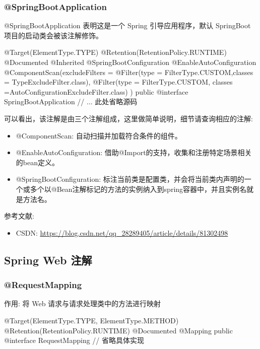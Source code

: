 \subsubsection{@SpringBootApplication}

@SpringBootApplication 表明这是一个 Spring 引导应用程序，默认 SpringBoot 项目的启动类会被该注解修饰。

\begin{Java}
@Target(ElementType.TYPE)
@Retention(RetentionPolicy.RUNTIME)
@Documented
@Inherited
@SpringBootConfiguration
@EnableAutoConfiguration
@ComponentScan(excludeFilters = { 
    @Filter(type = FilterType.CUSTOM,classes = TypeExcludeFilter.class), 
    @Filter(type = FilterType.CUSTOM, classes =AutoConfigurationExcludeFilter.class) })
public @interface SpringBootApplication {
    // ... 此处省略源码
}
\end{Java}

可以看出，该注解是由三个注解组成，这里做简单说明，细节请查询相应的注解:
\begin{itemize}
    \item @ComponentScan: 自动扫描并加载符合条件的组件。
    \item @EnableAutoConfiguration: 借助@Import的支持，收集和注册特定场景相关的bean定义。
    \item @SpringBootConfiguration: 标注当前类是配置类，并会将当前类内声明的一个或多个以@Bean注解标记的方法的实例纳入到spring容器中，并且实例名就是方法名。
\end{itemize}

参考文献:
\begin{itemize}
    \item CSDN: \url{https://blog.csdn.net/qq_28289405/article/details/81302498}
\end{itemize}

\subsection{Spring Web 注解}

\subsubsection{@RequestMapping}

作用: 将 Web 请求与请求处理类中的方法进行映射

\begin{Java}
@Target({ElementType.TYPE, ElementType.METHOD})
@Retention(RetentionPolicy.RUNTIME)
@Documented
@Mapping
public @interface RequestMapping {
    // 省略具体实现
}
\end{Java}

